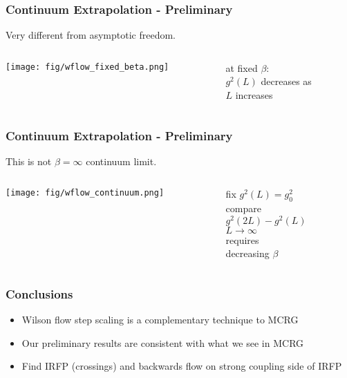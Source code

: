 \documentclass{beamer}
\begin{document}
  \begin{frame}
    \frametitle{Continuum Extrapolation - Preliminary}
    Very different from asymptotic freedom.
    \begin{columns}
      \begin{column}{0.7\textwidth}
        \texttt{[image: fig/wflow\_fixed\_beta.png]}
      \end{column}
      \begin{column}{0.3\textwidth}
        \begin{centering}
          \vspace{24pt}
          at fixed $\beta$:\\
          $g^2(L)$ decreases as\\
          $L$ increases\\
        \end{centering}
      \end{column}
    \end{columns}
  \end{frame}

  \begin{frame}
    \frametitle{Continuum Extrapolation - Preliminary}
    This is not $\beta = \infty$ continuum limit.
    \begin{columns}
      \begin{column}{0.7\textwidth}
        \texttt{[image: fig/wflow\_continuum.png]}
      \end{column}
      \begin{column}{0.3\textwidth}
        \begin{center}
          fix $g^2(L)=g_0^2$\\\vspace{24pt}
          compare\\$g^2(2L)-g^2(L)$\\\vspace{24pt}
          $L\rightarrow \infty$\\requires\\decreasing $\beta$
        \end{center}
      \end{column}
    \end{columns}
  \end{frame}

  \begin{frame}
    \frametitle{Conclusions}
    \begin{itemize}
      \item Wilson flow step scaling is a complementary technique to MCRG
      \item Our preliminary results are consistent with what we see in MCRG
      \item Find IRFP (crossings) and backwards flow on strong coupling side of IRFP
    \end{itemize}
  \end{frame}
\end{document}
